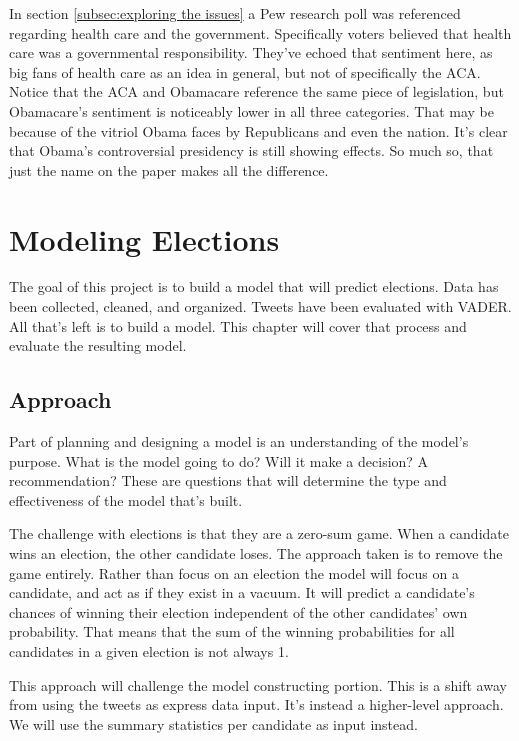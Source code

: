 \documentclass[11pt, twoside, reqno]{book}
\begin{document}
In section \ref{subsec:exploring the issues} a Pew research poll was referenced regarding health care and the government. Specifically voters believed that health care was a governmental responsibility. They've echoed that sentiment here, as big fans of health care as an idea in general, but not of specifically the ACA. Notice that the ACA and Obamacare reference the same piece of legislation, but Obamacare's sentiment is noticeably lower in all three categories. That may be because of the vitriol Obama faces by Republicans and even the nation. It's clear that Obama's controversial presidency is still showing effects. So much so, that just the name on the paper makes all the difference.  

\chapter{Modeling Elections}
\label{ch:modeling}
\hspace{0.2in}The goal of this project is to build a model that will predict elections. Data has been collected, cleaned, and organized. Tweets have been evaluated with VADER. All that's left is to build a model. This chapter will cover that process and evaluate the resulting model. 

\section{Approach}
\hspace{0.2in}Part of planning and designing a model is an understanding of the model's purpose. What is the model going to do? Will it make a decision? A recommendation? These are questions that will determine the type and effectiveness of the model that's built. 

The challenge with elections is that they are a zero-sum game. When a candidate wins an election, the other candidate loses. The approach taken is to remove the game entirely. Rather than focus on an election the model will focus on a candidate, and act as if they exist in a vacuum. It will predict a candidate's chances of winning their election independent of the other candidates' own probability. That means that the sum of the winning probabilities for all candidates in a given election is not always 1.

This approach will challenge the model constructing portion. This is a shift away from using the tweets as express data input. It's instead a higher-level approach. We will use the summary statistics per candidate as input instead. 
\end{document}
